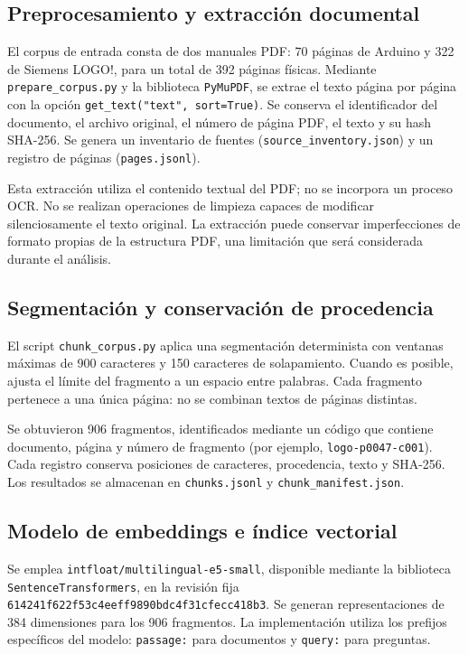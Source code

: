 \documentclass[11pt,a4paper]{article}
\begin{document}
\subsection{Preprocesamiento y extracción documental}
El corpus de entrada consta de dos manuales PDF: 70 páginas de Arduino y 322 de Siemens LOGO!, para un total de 392 páginas físicas. Mediante \texttt{prepare\_corpus.py} y la biblioteca \texttt{PyMuPDF}, se extrae el texto página por página con la opción \texttt{get\_text("text", sort=True)}. Se conserva el identificador del documento, el archivo original, el número de página PDF, el texto y su hash SHA-256. Se genera un inventario de fuentes (\texttt{source\_inventory.json}) y un registro de páginas (\texttt{pages.jsonl}).

Esta extracción utiliza el contenido textual del PDF; no se incorpora un proceso OCR. No se realizan operaciones de limpieza capaces de modificar silenciosamente el texto original. La extracción puede conservar imperfecciones de formato propias de la estructura PDF, una limitación que será considerada durante el análisis.

\subsection{Segmentación y conservación de procedencia}
El script \texttt{chunk\_corpus.py} aplica una segmentación determinista con ventanas máximas de 900 caracteres y 150 caracteres de solapamiento. Cuando es posible, ajusta el límite del fragmento a un espacio entre palabras. Cada fragmento pertenece a una única página: no se combinan textos de páginas distintas.

Se obtuvieron 906 fragmentos, identificados mediante un código que contiene documento, página y número de fragmento (por ejemplo, \texttt{logo-p0047-c001}). Cada registro conserva posiciones de caracteres, procedencia, texto y SHA-256. Los resultados se almacenan en \texttt{chunks.jsonl} y \texttt{chunk\_manifest.json}.

\subsection{Modelo de embeddings e índice vectorial}
Se emplea \texttt{intfloat/multilingual-e5-small}, disponible mediante la biblioteca \texttt{SentenceTransformers}, en la revisión fija \texttt{614241f622f53c4eeff9890bdc4f31cfecc418b3}. Se generan representaciones de 384 dimensiones para los 906 fragmentos. La implementación utiliza los prefijos específicos del modelo: \texttt{passage:} para documentos y \texttt{query:} para preguntas.
\end{document}
